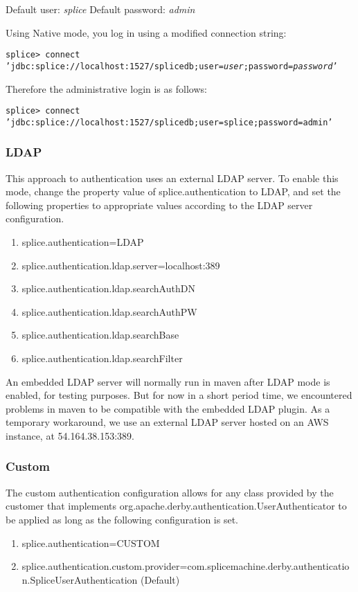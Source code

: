 Default user:  \emph{splice}    
Default password: \emph{admin}

Using Native mode, you log in using a modified connection string:

\texttt{splice> connect 'jdbc:splice://localhost:1527/splicedb;user=\emph{user};password=\emph{password}'}

Therefore the administrative login is as follows:

\texttt{splice> connect 'jdbc:splice://localhost:1527/splicedb;user=splice;password=admin'}

\subsubsection{LDAP}
This approach to authentication uses an external LDAP server. To enable this mode, change the property value of splice.authentication to LDAP, and set the following properties to appropriate values according to the LDAP server configuration. 
\begin{enumerate}
        \item splice.authentication=LDAP
        \item splice.authentication.ldap.server=localhost:389
        \item splice.authentication.ldap.searchAuthDN
        \item splice.authentication.ldap.searchAuthPW
        \item splice.authentication.ldap.searchBase
        \item splice.authentication.ldap.searchFilter
\end{enumerate}
An embedded LDAP server will normally run in maven after LDAP mode is enabled, for testing purposes. But for now in a short period time, we encountered problems in maven to be compatible with the embedded LDAP plugin. As a temporary workaround, we use an external LDAP server hosted on an AWS instance, at 54.164.38.153:389. 

\subsubsection{Custom}

The custom authentication
configuration allows for any
class provided by the customer
that implements org.apache.derby.authentication.UserAuthenticator
to be applied as long as the following configuration is set.

\begin{enumerate}
        \item splice.authentication=CUSTOM
        \item   splice.authentication.custom.provider=com.splicemachine.derby.authentication.SpliceUserAuthentication (Default)
\end{enumerate}

